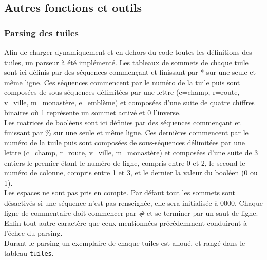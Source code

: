 \documentclass[a4paper, 11pt]{article}
\begin{document}
    
	\subsection{Autres fonctions et outils}\label{sec:autre-fct}
		\subsubsection{Parsing des tuiles}\label{sec:autre-fct-parsing}
			\indent Afin de charger dynamiquement et en dehors du code toutes les définitions des tuiles, un parseur à été implémenté. Les tableaux de sommets de chaque tuile sont ici définis par des séquences commençant et finissant par * sur une seule et même ligne. Ces séquences commencent par le numéro de la tuile puis sont composées de sous séquences délimitées par une lettre (c=champ, r=route, v=ville, m=monastère, e=emblème) et composées d'une suite de quatre chiffres binaires où 1 représente un sommet activé et 0 l'inverse.\\
			\indent Les matrices de booléens sont ici définies par des séquences commençant et finissant par \% sur une seule et même ligne. Ces dernières commencent par le numéro de la tuile puis sont composées de sous-séquences délimitées par une lettre (c=champ, r=route, v=ville, m=monastère) et composées d'une suite de 3 entiers le premier étant le numéro de ligne, compris entre 0 et 2, le second le numéro de colonne, compris entre 1 et 3, et le dernier la valeur du booléen (0 ou 1).\\
			\indent Les espaces ne sont pas pris en compte. Par défaut tout les sommets sont désactivés si  une séquence n'est pas renseignée, elle sera initialisée à 0000. Chaque ligne de commentaire doit commencer par \emph{\#} et se terminer par un saut de ligne. Enfin tout autre caractère que ceux mentionnées précédemment conduiront à l'échec du parsing.\\

			\indent Durant le parsing un exemplaire de chaque tuiles est alloué, et rangé dans le tableau \verb!tuiles!.
\end{document}

